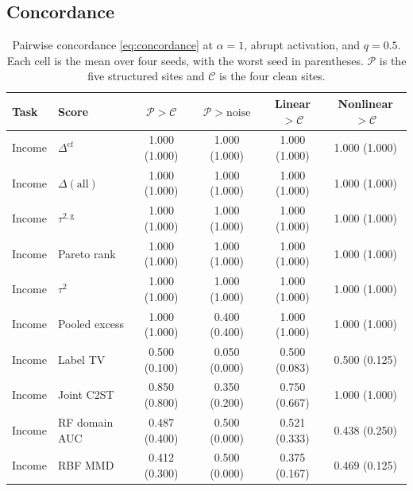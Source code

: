 \subsection{Concordance}
\label{sec:concordance}

\begin{table}[t]
\centering
\caption{Pairwise concordance \eqref{eq:concordance} at $\alpha=1$, abrupt
activation, and $q=0.5$.
Each cell is the mean over four seeds, with the worst seed in parentheses.
$\mathcal{P}$ is the five structured sites and $\mathcal{C}$ is the four
clean sites.}
\label{tab:concordance}
\small
\begin{tabular}{llcccc}
\toprule
Task & Score & $\mathcal{P}>\mathcal{C}$ & $\mathcal{P}>\mathrm{noise}$ & Linear $>\mathcal{C}$ & Nonlinear $>\mathcal{C}$ \\
\midrule
Income & $\Delta^{\mathrm{cf}}$ & 1.000 {\scriptsize(1.000)} & 1.000 {\scriptsize(1.000)} & 1.000 {\scriptsize(1.000)} & 1.000 {\scriptsize(1.000)} \\
Income & $\Delta(\mathrm{all})$ & 1.000 {\scriptsize(1.000)} & 1.000 {\scriptsize(1.000)} & 1.000 {\scriptsize(1.000)} & 1.000 {\scriptsize(1.000)} \\
Income & $\tau^{2,\mathrm{g}}$ & 1.000 {\scriptsize(1.000)} & 1.000 {\scriptsize(1.000)} & 1.000 {\scriptsize(1.000)} & 1.000 {\scriptsize(1.000)} \\
Income & Pareto rank & 1.000 {\scriptsize(1.000)} & 1.000 {\scriptsize(1.000)} & 1.000 {\scriptsize(1.000)} & 1.000 {\scriptsize(1.000)} \\
Income & $\tau^2$ & 1.000 {\scriptsize(1.000)} & 1.000 {\scriptsize(1.000)} & 1.000 {\scriptsize(1.000)} & 1.000 {\scriptsize(1.000)} \\
Income & Pooled excess & 1.000 {\scriptsize(1.000)} & 0.400 {\scriptsize(0.400)} & 1.000 {\scriptsize(1.000)} & 1.000 {\scriptsize(1.000)} \\
Income & Label TV & 0.500 {\scriptsize(0.100)} & 0.050 {\scriptsize(0.000)} & 0.500 {\scriptsize(0.083)} & 0.500 {\scriptsize(0.125)} \\
Income & Joint C2ST & 0.850 {\scriptsize(0.800)} & 0.350 {\scriptsize(0.200)} & 0.750 {\scriptsize(0.667)} & 1.000 {\scriptsize(1.000)} \\
Income & RF domain AUC & 0.487 {\scriptsize(0.400)} & 0.500 {\scriptsize(0.000)} & 0.521 {\scriptsize(0.333)} & 0.438 {\scriptsize(0.250)} \\
Income & RBF MMD & 0.412 {\scriptsize(0.300)} & 0.500 {\scriptsize(0.000)} & 0.375 {\scriptsize(0.167)} & 0.469 {\scriptsize(0.125)} \\

\end{tabular}
\end{table}
